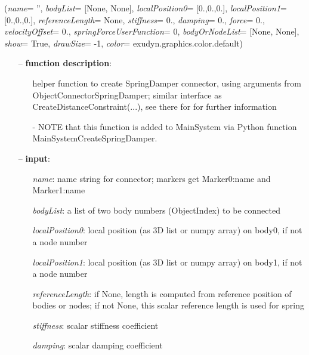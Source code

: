 %
\begin{flushleft}
\label{sec:mainsystemextensions:CreateSpringDamper}
({\it name}= '', {\it bodyList}= [None, None], {\it localPosition0}= [0.,0.,0.], {\it localPosition1}= [0.,0.,0.], {\it referenceLength}= None, {\it stiffness}= 0., {\it damping}= 0., {\it force}= 0., {\it velocityOffset}= 0., {\it springForceUserFunction}= 0, {\it bodyOrNodeList}= [None, None], {\it show}= True, {\it drawSize}= -1, {\it color}= exudyn.graphics.color.default)
\end{flushleft}
\setlength{\itemindent}{0.7cm}
\begin{itemize}[leftmargin=0.7cm]
\item[--]
{\bf function description}: \vspace{-6pt}
\begin{itemize}[leftmargin=1.2cm]
\setlength{\itemindent}{-0.7cm}
\item[]helper function to create SpringDamper connector, using arguments from ObjectConnectorSpringDamper; similar interface as CreateDistanceConstraint(...), see there for for further information
\item[]- NOTE that this function is added to MainSystem via Python function MainSystemCreateSpringDamper.
\end{itemize}
\item[--]
{\bf input}: \vspace{-6pt}
\begin{itemize}[leftmargin=1.2cm]
\setlength{\itemindent}{-0.7cm}
\item[]{\it name}: name string for connector; markers get Marker0:name and Marker1:name
\item[]{\it bodyList}: a list of two body numbers (ObjectIndex) to be connected
\item[]{\it localPosition0}: local position (as 3D list or numpy array) on body0, if not a node number
\item[]{\it localPosition1}: local position (as 3D list or numpy array) on body1, if not a node number
\item[]{\it referenceLength}: if None, length is computed from reference position of bodies or nodes; if not None, this scalar reference length is used for spring
\item[]{\it stiffness}: scalar stiffness coefficient
\item[]{\it damping}: scalar damping coefficient

\end{itemize}
\end{itemize}
